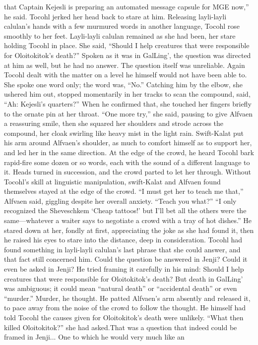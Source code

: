 \documentclass[9pt]{article}
\begin{document}
that Captain Kejesli is preparing an automated message capsule for MGE now,” he said.
Tocohl jerked her head back to stare at him. Releasing layli-layli calulan’s hands with a few
murmured words in another language, Tocohl rose smoothly to her feet. Layli-layli calulan remained as
she had been, her stare holding Tocohl in place.
She said, “Should I help creatures that were responsible for Oloitokitok’s death?” Spoken as it was
in GalLing’, the question was directed at him as well, but he had no answer. The question itself was
unreliable.
Again Tocohl dealt with the matter on a level he himself would not have been able to. She spoke one
word only; the word was, “No.”
Catching him by the elbow, she ushered him out, stopped momentarily in her tracks to scan the
compound, said, “Ah: Kejesli’s quarters?” When he confirmed that, she touched her fingers briefly to the
ornate pin at her throat. “One more try,” she said, pausing to give Alfvaen a reassuring smile, then she
squared her shoulders and strode across the compound, her cloak swirling like heavy mist in the light
rain.
Swift-Kalat put his arm around Alfvaen’s shoulder, as much to comfort himself as to support her, and
led her in the same direction. At the edge of the crowd, he heard Tocohl bark rapid-fire some dozen or
so words, each with the sound of a different language to it. Heads turned in succession, and the crowd
parted to let her through.
Without Tocohl’s skill at linguistic manipulation, swift-Kalat and Alfvaen found themselves stayed at
the edge of the crowd. “I must get her to teach me that,” Alfvaen said, giggling despite her overall
anxiety.
“Teach you what?”
“I only recognized the Sheveschkem ‘Cheap tattoos!’ but I’ll bet all the others were the
same—whatever a waiter says to negotiate a crowd with a tray of hot dishes.”
He stared down at her, fondly at first, appreciating the joke as she had found it, then he raised his
eyes to stare into the distance, deep in consideration.
Tocohl had found something in layli-layli calulan’s last phrase that she could answer, and that fact
still concerned him. Could the question be answered in Jenji? Could it even be asked in Jenji?
He tried framing it carefully in his mind: Should I help creatures that were responsible for
Oloitokitok’s death? But death in GalLing’ was ambiguous; it could mean “natural death” or “accidental
death” or even “murder.”
Murder, he thought. He patted Alfvaen’s arm absently and released it, to pace away from the noise
of the crowd to follow the thought. He himself had told Tocohl the causes given for Oloitokitok’s death
were unlikely. “What then killed Oloitokitok?” she had asked.That was a question that indeed could be framed in Jenji... One to which he would very much like an
\end{document}
